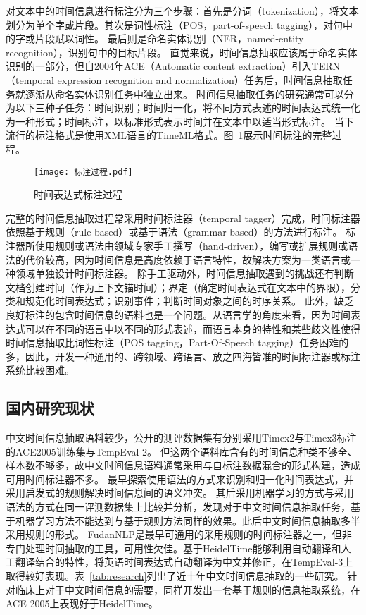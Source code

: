 对文本中的时间信息进行标注分为三个步骤：首先是分词（tokenization），将文本划分为单个字或片段。其次是词性标注（POS，part-of-speech tagging），对句中的字或片段赋以词性。
最后则是命名实体识别（NER，named-entity recognition），识别句中的目标片段。
直觉来说，时间信息抽取应该属于命名实体识别的一部分，但自2004年ACE\cite{doddington2004automatic}（Automatic content extraction）引入TERN（temporal expression recognition and normalization）任务后，时间信息抽取任务就逐渐从命名实体识别任务中独立出来。
时间信息抽取任务的研究通常可以分为以下三种子任务：时间识别；时间归一化，将不同方式表述的时间表达式统一化为一种形式；时间标注，以标准形式表示时间并在文本中以适当形式标注。
当下流行的标注格式是使用XML语言的TimeML\cite{pustejovsky2003timeml}格式。图~\ref{fig:tagging_pregress}展示时间标注的完整过程。

\begin{figure}[h]
    \centering
    \texttt{[image: 标注过程.pdf]}
    \caption{时间表达式标注过程}
    \label{fig:tagging_pregress}
\end{figure}



完整的时间信息抽取过程常采用时间标注器（temporal tagger）完成，时间标注器依照基于规则（rule-based）或基于语法（grammar-based）的方法进行标注。
标注器所使用规则或语法由领域专家手工撰写（hand-driven），编写或扩展规则或语法的代价较高，因为时间信息是高度依赖于语言特性，故解决方案为一类语言或一种领域单独设计时间标注器。
除手工驱动外，时间信息抽取遇到的挑战还有判断文档创建时间（作为上下文锚时间）；界定（确定时间表达式在文本中的界限），分类和规范化时间表达式；识别事件；判断时间对象之间的时序关系。
此外，缺乏良好标注的包含时间信息的语料也是一个问题。从语言学的角度来看，因为时间表达式可以在不同的语言中以不同的形式表述，而语言本身的特性和某些歧义性使得时间信息抽取比词性标注（POS tagging，Part-Of-Speech tagging）任务困难的多，因此，开发一种通用的、跨领域、跨语言、放之四海皆准的时间标注器或标注系统比较困难。

\subsection{国内研究现状}

中文时间信息抽取语料较少，公开的测评数据集有分别采用Timex2与Timex3标注的ACE2005训练集与TempEval-2。
但这两个语料库含有的时间信息种类不够全、样本数不够多，故中文时间信息语料通常采用与自标注数据混合的形式构建，造成可用时间标注器不多。
\citet{mingli2005ctemp}最早探索使用语法的方式来识别和归一化时间表达式，并采用启发式的规则解决时间信息间的语义冲突。
其后\citet{wu2005normalizing}采用机器学习的方式与采用语法的方式在同一评测数据集上比较并分析，发现对于中文时间信息抽取任务，基于机器学习方法不能达到与基于规则方法同样的效果。此后中文时间信息抽取多半采用规则的形式。
FudanNLP\cite{qiu2013fudannlp}是最早可通用的采用规则的时间标注器之一，但非专门处理时间抽取的工具，可用性欠佳。\citet{li2014chinese}基于HeidelTime能够利用自动翻译和人工翻译结合的特性，将英语时间表达式自动翻译为中文并修正，在TempEval-3上取得较好表现。表~\ref{tab:research}列出了近十年中文时间信息抽取的一些研究。
\citet{liu2016cmedtex}针对临床上对于中文时间信息的需要，同样开发出一套基于规则的信息抽取系统，在ACE 2005上表现好于HeidelTime。

